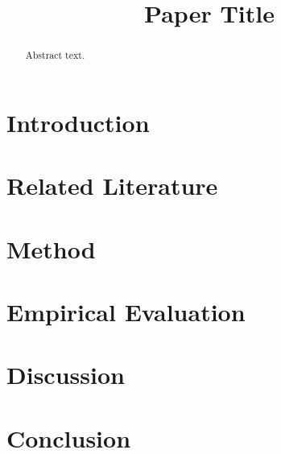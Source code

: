 \documentclass[11pt]{article}
\title{Paper Title}
\author{}
\date{}
\begin{document}
\maketitle

\begin{abstract}
Abstract text.
\end{abstract}

\section{Introduction}

\section{Related Literature}

\section{Method}

\section{Empirical Evaluation}

\section{Discussion}

\section{Conclusion}


\end{document}
